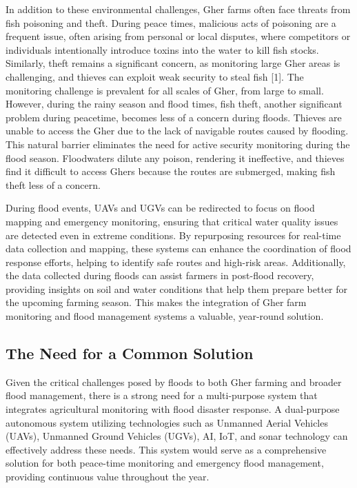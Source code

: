 \documentclass[conference]{IEEEtran}
\begin{document}
In addition to these environmental challenges, Gher farms often face threats from fish poisoning and theft. During peace times, malicious acts of poisoning are a frequent issue, often arising from personal or local disputes, where competitors or individuals intentionally introduce toxins into the water to kill fish stocks. Similarly, theft remains a significant concern, as monitoring large Gher areas is challenging, and thieves can exploit weak security to steal fish [1]. The monitoring challenge is prevalent for all scales of Gher, from large to small. However, during the rainy season and flood times, fish theft, another significant problem during peacetime, becomes less of a concern during floods. Thieves are unable to access the Gher due to the lack of navigable routes caused by flooding. This natural barrier eliminates the need for active security monitoring during the flood season. Floodwaters dilute any poison, rendering it ineffective, and thieves find it difficult to access Ghers because the routes are submerged, making fish theft less of a concern.

During flood events, UAVs and UGVs can be redirected to focus on flood mapping and emergency monitoring, ensuring that critical water quality issues are detected even in extreme conditions. By repurposing resources for real-time data collection and mapping, these systems can enhance the coordination of flood response efforts, helping to identify safe routes and high-risk areas. Additionally, the data collected during floods can assist farmers in post-flood recovery, providing insights on soil and water conditions that help them prepare better for the upcoming farming season. This makes the integration of Gher farm monitoring and flood management systems a valuable, year-round solution.

\subsection{\textbf{The Need for a Common Solution}}
Given the critical challenges posed by floods to both Gher farming and broader flood management, there is a strong need for a multi-purpose system that integrates agricultural monitoring with flood disaster response. A dual-purpose autonomous system utilizing technologies such as Unmanned Aerial Vehicles (UAVs), Unmanned Ground Vehicles (UGVs), AI, IoT, and sonar technology can effectively address these needs. This system would serve as a comprehensive solution for both peace-time monitoring and emergency flood management, providing continuous value throughout the year.
\end{document}
